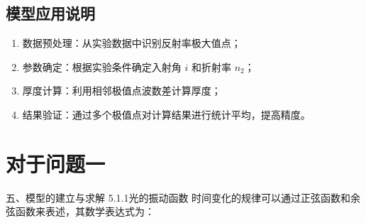\documentclass{ctexart} %
\begin{document}
\subsection{模型应用说明}
\begin{enumerate}
    \item 数据预处理：从实验数据中识别反射率极大值点；
    \item 参数确定：根据实验条件确定入射角 \(i\) 和折射率 \(n_2\)；
    \item 厚度计算：利用相邻极值点波数差计算厚度；
    \item 结果验证：通过多个极值点对计算结果进行统计平均，提高精度。
\end{enumerate}


\section{对于问题一}
五、模型的建立与求解
5.1.1光的振动函数
时间变化的规律可以通过正弦函数和余弦函数来表述，其数学表达式为：
\end{document}
